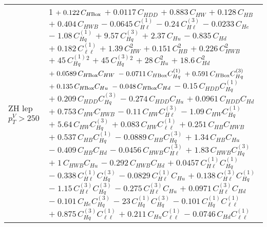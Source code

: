 \begin{tabular}{l|p{}}
    ZH lep $p_{T}^{V} > 250$ & 1 $+\;0.122\,C_{H\rm{Box}}$ $+\;0.0117\,C_{HDD}$ $+\;0.883\,C_{HW}$ $+\;0.128\,C_{HB}$ $+\;0.404\,C_{HWB}$ $-\;0.0645\,C^{(1)}_{H\ell}$ $-\;0.24\,C^{(3)}_{H\ell}$ $-\;0.0233\,C_{He}$ $-\;1.08\,C^{(1)}_{Hq}$ $+\;9.57\,C^{(3)}_{Hq}$ $+\;2.37\,C_{Hu}$ $-\;0.835\,C_{Hd}$ $+\;0.182\,C^{(1)}_{\ell\ell}$ $+\;1.39\,C_{HW}^{2}$ $+\;0.151\,C_{HB}^{2}$ $+\;0.226\,C_{HWB}^{2}$ $+\;45\,C^{(1)}_{Hq}^{2}$ $+\;45\,C^{(3)}_{Hq}^{2}$ $+\;28\,C_{Hu}^{2}$ $+\;18.6\,C_{Hd}^{2}$ $+\;0.0589\,C_{H\rm{Box}}C_{HW}$ $-\;0.0711\,C_{H\rm{Box}}C^{(1)}_{Hq}$ $+\;0.591\,C_{H\rm{Box}}C^{(3)}_{Hq}$ $+\;0.135\,C_{H\rm{Box}}C_{Hu}$ $-\;0.048\,C_{H\rm{Box}}C_{Hd}$ $-\;0.15\,C_{HDD}C^{(1)}_{Hq}$ $+\;0.209\,C_{HDD}C^{(3)}_{Hq}$ $-\;0.274\,C_{HDD}C_{Hu}$ $+\;0.0961\,C_{HDD}C_{Hd}$ $+\;0.753\,C_{HW}C_{HWB}$ $-\;0.11\,C_{HW}C^{(3)}_{H\ell}$ $-\;1.09\,C_{HW}C^{(1)}_{Hq}$ $+\;5.64\,C_{HW}C^{(3)}_{Hq}$ $+\;0.083\,C_{HW}C^{(1)}_{\ell\ell}$ $+\;0.251\,C_{HB}C_{HWB}$ $+\;0.537\,C_{HB}C^{(1)}_{Hq}$ $-\;0.0889\,C_{HB}C^{(3)}_{Hq}$ $+\;1.34\,C_{HB}C_{Hu}$ $-\;0.409\,C_{HB}C_{Hd}$ $-\;0.0456\,C_{HWB}C^{(3)}_{H\ell}$ $+\;1.83\,C_{HWB}C^{(3)}_{Hq}$ $+\;1\,C_{HWB}C_{Hu}$ $-\;0.292\,C_{HWB}C_{Hd}$ $+\;0.0457\,C^{(1)}_{H\ell}C^{(1)}_{Hq}$ $-\;0.338\,C^{(1)}_{H\ell}C^{(3)}_{Hq}$ $-\;0.0829\,C^{(1)}_{H\ell}C_{Hu}$ $+\;0.138\,C^{(3)}_{H\ell}C^{(1)}_{Hq}$ $-\;1.15\,C^{(3)}_{H\ell}C^{(3)}_{Hq}$ $-\;0.275\,C^{(3)}_{H\ell}C_{Hu}$ $+\;0.0971\,C^{(3)}_{H\ell}C_{Hd}$ $-\;0.101\,C_{He}C^{(3)}_{Hq}$ $-\;23\,C^{(1)}_{Hq}C^{(3)}_{Hq}$ $-\;0.101\,C^{(1)}_{Hq}C^{(1)}_{\ell\ell}$ $+\;0.875\,C^{(3)}_{Hq}C^{(1)}_{\ell\ell}$ $+\;0.211\,C_{Hu}C^{(1)}_{\ell\ell}$ $-\;0.0746\,C_{Hd}C^{(1)}_{\ell\ell}$ \\
\end{tabular}